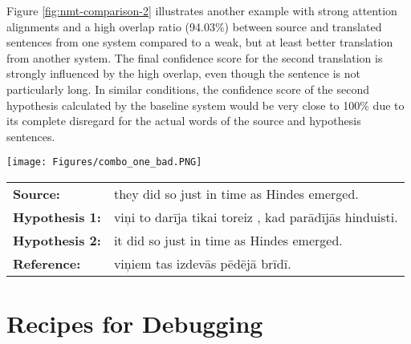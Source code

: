 \documentclass[runningheads,a4paper]{lncs/llncs}
\begin{document}
Figure \ref{fig:nmt-comparison-2} illustrates another example with strong attention alignments and a high overlap ratio (94.03\%) between source and translated sentences from one system compared to a weak, but at least better translation from another system. The final confidence score for the second translation is strongly influenced by the high overlap, even though the sentence is not particularly long. In similar conditions, the confidence score of the second hypothesis calculated by the baseline system would be very close to 100\% due to its complete disregard for the actual words of the source and hypothesis sentences. 

\begin{figure*}[ht]
  \texttt{[image: Figures/combo\_one\_bad.PNG]}
  \begin{tabular}{lp{10.4cm}}
   \bf Source: & they did so just in time as Hindes emerged. \\
   \bf Hypothesis 1: & viņi to darīja tikai toreiz , kad parādījās hinduisti. \\
   \bf Hypothesis 2: & it did so just in time as Hindes emerged. \\
   \bf Reference: & viņiem tas izdevās pēdējā brīdī. \\
  \end{tabular}
  \caption{A comparison of lower and higher scoring hypotheses from two different NMT systems. 
  Scores for Hypothesis 1 (orange): Confidence \textbf{53.1\%}; Overlap \textbf{0.9\%}. Scores for Hypothesis 2 (green): Confidence \textbf{28.63\%}; Overlap \textbf{94.03\%}. }
  \label{fig:nmt-comparison-2}
\end{figure*}


\section{Recipes for Debugging}
\label{sec:debugging}
\end{document}
